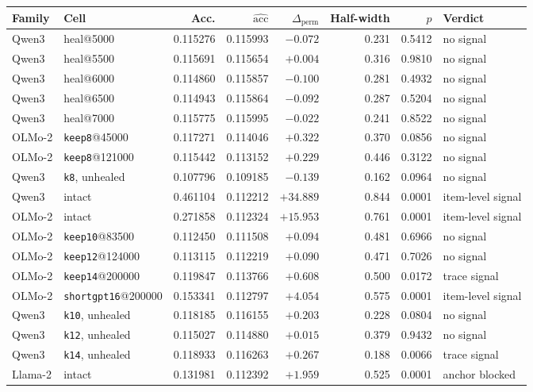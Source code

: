 \begin{table}[t]
\centering
\scriptsize
\setlength{\tabcolsep}{3.2pt}
\begin{tabular}{llrrrrrl}
\toprule
Family & Cell & Acc. & $\widehat{\mathrm{acc}}$ & $\Delta_{\mathrm{perm}}$ & Half-width & $p$ & Verdict \\
\midrule
Qwen3 & heal@5000 & 0.115276 & 0.115993 & $-0.072$ & 0.231 & 0.5412 & no signal \\
Qwen3 & heal@5500 & 0.115691 & 0.115654 & $+0.004$ & 0.316 & 0.9810 & no signal \\
Qwen3 & heal@6000 & 0.114860 & 0.115857 & $-0.100$ & 0.281 & 0.4932 & no signal \\
Qwen3 & heal@6500 & 0.114943 & 0.115864 & $-0.092$ & 0.287 & 0.5204 & no signal \\
Qwen3 & heal@7000 & 0.115775 & 0.115995 & $-0.022$ & 0.241 & 0.8522 & no signal \\
OLMo-2 & \texttt{keep8}@45000 & 0.117271 & 0.114046 & $+0.322$ & 0.370 & 0.0856 & no signal \\
OLMo-2 & \texttt{keep8}@121000 & 0.115442 & 0.113152 & $+0.229$ & 0.446 & 0.3122 & no signal \\
Qwen3 & \texttt{k8}, unhealed & 0.107796 & 0.109185 & $-0.139$ & 0.162 & 0.0964 & no signal \\
Qwen3 & intact & 0.461104 & 0.112212 & $+34.889$ & 0.844 & 0.0001 & item-level signal \\
OLMo-2 & intact & 0.271858 & 0.112324 & $+15.953$ & 0.761 & 0.0001 & item-level signal \\
OLMo-2 & \texttt{keep10}@83500 & 0.112450 & 0.111508 & $+0.094$ & 0.481 & 0.6966 & no signal \\
OLMo-2 & \texttt{keep12}@124000 & 0.113115 & 0.112219 & $+0.090$ & 0.471 & 0.7026 & no signal \\
OLMo-2 & \texttt{keep14}@200000 & 0.119847 & 0.113766 & $+0.608$ & 0.500 & 0.0172 & trace signal \\
OLMo-2 & \texttt{shortgpt16}@200000 & 0.153341 & 0.112797 & $+4.054$ & 0.575 & 0.0001 & item-level signal \\
Qwen3 & \texttt{k10}, unhealed & 0.118185 & 0.116155 & $+0.203$ & 0.228 & 0.0804 & no signal \\
Qwen3 & \texttt{k12}, unhealed & 0.115027 & 0.114880 & $+0.015$ & 0.379 & 0.9432 & no signal \\
Qwen3 & \texttt{k14}, unhealed & 0.118933 & 0.116263 & $+0.267$ & 0.188 & 0.0066 & trace signal \\
Llama-2 & intact & 0.131981 & 0.112392 & $+1.959$ & 0.525 & 0.0001 & anchor blocked \\

\end{tabular}
\end{table}

